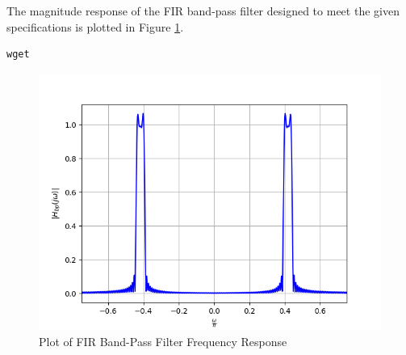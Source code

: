 \documentclass{article}
\begin{document}
The magnitude response of the FIR band-pass filter designed to meet the given specifications is plotted in Figure \ref{fig:9}.
\begin{lstlisting}[caption = {Code for Figure 9}]
wget 
\end{lstlisting}
\begin{figure}[!h]
    \centering
    \includegraphics[width = \columnwidth]{figs/firHbp.png}
    \caption{Plot of FIR Band-Pass Filter Frequency Response}
    \label{fig:9}
\end{figure}
\end{document}

